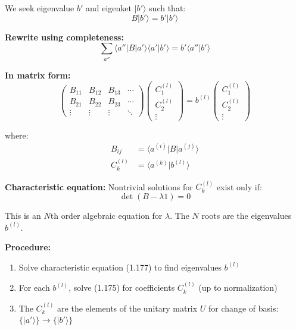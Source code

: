 \documentclass[11pt,a4paper]{article}
\begin{document}
We seek eigenvalue $b'$ and eigenket $|b'\rangle$ such that:
\begin{equation}
B|b'\rangle = b'|b'\rangle
\tag{1.173}
\end{equation}

\textbf{Rewrite using completeness:}
\begin{equation}
\sum_{a''}\langle a''|B|a'\rangle\langle a'|b'\rangle = b'\langle a''|b'\rangle
\tag{1.174}
\end{equation}

\textbf{In matrix form:}
\begin{equation}
\begin{pmatrix}
B_{11} & B_{12} & B_{13} & \cdots \\
B_{21} & B_{22} & B_{23} & \cdots \\
\vdots & \vdots & \vdots & \ddots
\end{pmatrix}
\begin{pmatrix}
C_1^{(l)} \\
C_2^{(l)} \\
\vdots
\end{pmatrix}
= b^{(l)}
\begin{pmatrix}
C_1^{(l)} \\
C_2^{(l)} \\
\vdots
\end{pmatrix}
\tag{1.175}
\end{equation}

where:
\begin{align}
B_{ij} &= \langle a^{(i)}|B|a^{(j)}\rangle \tag{1.176a} \\
C_k^{(l)} &= \langle a^{(k)}|b^{(l)}\rangle \tag{1.176b}
\end{align}

\textbf{Characteristic equation:}
Nontrivial solutions for $C_k^{(l)}$ exist only if:
\begin{equation}
\boxed{\det(B - \lambda 1) = 0}
\tag{1.177}
\end{equation}

This is an $N$th order algebraic equation for $\lambda$. The $N$ roots are the eigenvalues $b^{(l)}$.

\textbf{Procedure:}
\begin{enumerate}
\item Solve characteristic equation (1.177) to find eigenvalues $b^{(l)}$
\item For each $b^{(l)}$, solve (1.175) for coefficients $C_k^{(l)}$ (up to normalization)
\item The $C_k^{(l)}$ are the elements of the unitary matrix $U$ for change of basis: $\{|a'\rangle\} \to \{|b'\rangle\}$
\end{enumerate}
\end{document}
